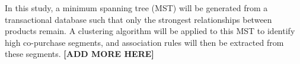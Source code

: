 \documentclass[paper=a4,fontsize=11pt]{report}	%
\begin{document}
In this study, a minimum spanning tree (MST) will be generated from a transactional database such that only the strongest relationships between products remain. A clustering algorithm will be applied to this MST to identify high co-purchase segments, and association rules will then be extracted from these segments. \textbf{[ADD MORE HERE]}

\newpage\tableofcontents\newpage





\setcounter{page}{1}		%

\pagestyle{fancy}
\fancyhf{}
\lhead{\leftmark}







\printbibliography[heading=bibintoc, title=References]

\end{document}
